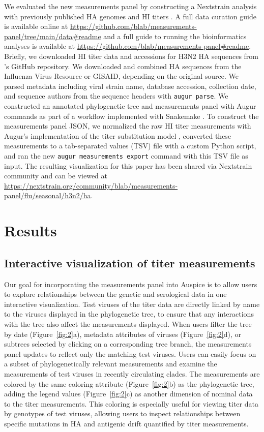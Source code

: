 \documentclass[utf8]{FrontiersinHarvard} %
\begin{document}
We evaluated the new measurements panel by constructing a Nextstrain analysis \citep{Hadfield2018} with previously published HA genomes and HI titers \citep{Bedford:2014bf}.
A full data curation guide is available online at \url{https://github.com/blab/measurements-panel/tree/main/data#readme} and a full guide to running the bioinformatics analyses is available at \url{https://github.com/blab/measurements-panel#readme}.
Briefly, we downloaded HI titer data and accessions for H3N2 HA sequences from \cite{Bedford:2014bf}'s GitHub repository.
We downloaded and combined HA sequences from the Influenza Virus Resource or GISAID, depending on the original source.
We parsed metadata including viral strain name, database accession, collection date, and sequence authors from the sequence headers with \texttt{augur parse}.
We constructed an annotated phylogenetic tree and measurements panel with Augur commands as part of a workflow implemented with Snakemake \citep{Molder2021}.
To construct the measurements panel JSON, we normalized the raw HI titer measurements with Augur's implementation of the titer substitution model \citep{Neher:2016hy}, converted these measurements to a tab-separated values (TSV) file with a custom Python script, and ran the new \texttt{augur measurements export} command with this TSV file as input.
The resulting visualization for this paper has been shared via Nextstrain community and can be viewed at \url{https://nextstrain.org/community/blab/measurements-panel/flu/seasonal/h3n2/ha}.

\section{Results}

\subsection{Interactive visualization of titer measurements}

Our goal for incorporating the measurements panel into Auspice is to allow users to explore relationships between the genetic and serological data in one interactive visualization.
Test viruses of the titer data are directly linked by name to the viruses displayed in the phylogenetic tree, to ensure that any interactions with the tree also affect the measurements displayed.
When users filter the tree by date (Figure~\ref{fig:2}a), metadata attributes of viruses (Figure~\ref{fig:2}d), or subtrees selected by clicking on a corresponding tree branch, the measurements panel updates to reflect only the matching test viruses.
Users can easily focus on a subset of phylogenetically relevant measurements and examine the measurements of test viruses in recently circulating clades.
The measurements are colored by the same coloring attribute (Figure~\ref{fig:2}b) as the phylogenetic tree, adding the legend values (Figure~\ref{fig:2}c) as another dimension of nominal data to the titer measurements.
This coloring is especially useful for viewing titer data by genotypes of test viruses, allowing users to inspect relationships between specific mutations in HA and antigenic drift quantified by titer measurements.
\end{document}
